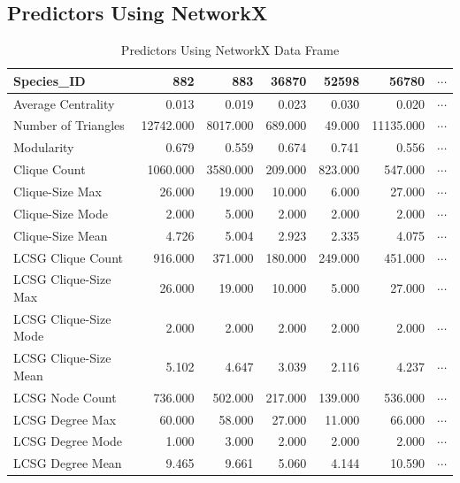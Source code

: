 \documentclass[12pt]{article}
\begin{document}
\subsection{Predictors Using NetworkX}
\begin{table}[H]
\centering
\caption{Predictors Using NetworkX Data Frame}
\begin{tabular}{lrrrrrr}
\toprule
Species\_ID &      882   &     883   &    36870 &    52598 &      56780 & $\cdots$ \\
\midrule
Average Centrality    &      0.013 &     0.019 &    0.023 &    0.030 &      0.020 & $\cdots$ \\
Number of Triangles   &  12742.000 &  8017.000 &  689.000 &   49.000 &  11135.000 & $\cdots$\\
Modularity            &      0.679 &     0.559 &    0.674 &    0.741 &      0.556 & $\cdots$\\
Clique Count          &   1060.000 &  3580.000 &  209.000 &  823.000 &    547.000 & $\cdots$\\
Clique-Size Max       &     26.000 &    19.000 &   10.000 &    6.000 &     27.000 & $\cdots$\\
Clique-Size Mode      &      2.000 &     5.000 &    2.000 &    2.000 &      2.000 & $\cdots$\\
Clique-Size Mean      &      4.726 &     5.004 &    2.923 &    2.335 &      4.075 & $\cdots$\\
LCSG Clique Count     &    916.000 &   371.000 &  180.000 &  249.000 &    451.000 & $\cdots$\\
LCSG Clique-Size Max  &     26.000 &    19.000 &   10.000 &    5.000 &     27.000 & $\cdots$\\
LCSG Clique-Size Mode &      2.000 &     2.000 &    2.000 &    2.000 &      2.000 & $\cdots$\\
LCSG Clique-Size Mean &      5.102 &     4.647 &    3.039 &    2.116 &      4.237 & $\cdots$\\
LCSG Node Count       &    736.000 &   502.000 &  217.000 &  139.000 &    536.000 & $\cdots$\\
LCSG Degree Max       &     60.000 &    58.000 &   27.000 &   11.000 &     66.000 & $\cdots$\\
LCSG Degree Mode      &      1.000 &     3.000 &    2.000 &    2.000 &      2.000 & $\cdots$\\
LCSG Degree Mean      &      9.465 &     9.661 &    5.060 &    4.144 &     10.590 & $\cdots$\\
\bottomrule
\end{tabular}
\end{table} \newpage
\end{document}
